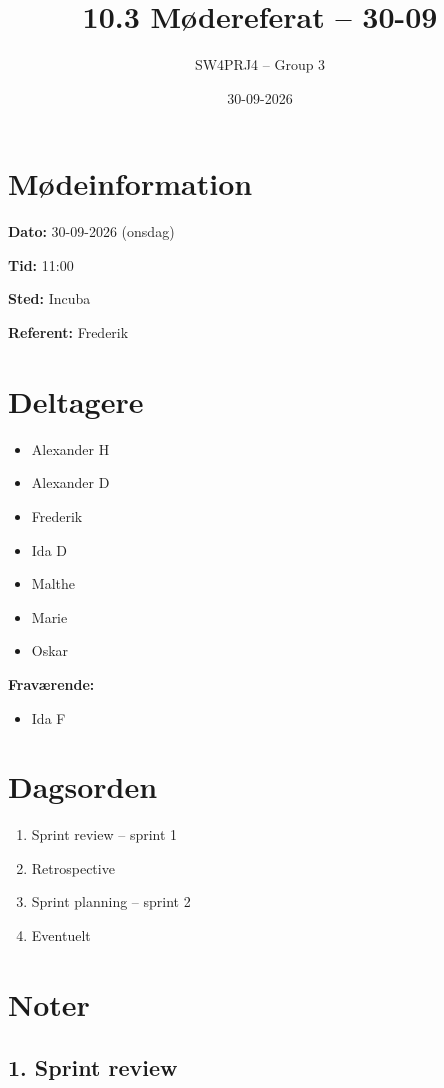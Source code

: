 \documentclass[a4paper,11pt]{article}
\title{10.3 Mødereferat -- 30-09}
\author{SW4PRJ4 -- Group 3}
\date{30-09-2026}
\begin{document}
\maketitle

\section*{Mødeinformation}

\textbf{Dato:} 30-09-2026 (onsdag)

\textbf{Tid:} 11:00

\textbf{Sted:} Incuba

\textbf{Referent:} Frederik

\section*{Deltagere}

\begin{itemize}
    \item Alexander H
    \item Alexander D
    \item Frederik
    \item Ida D
    \item Malthe
    \item Marie
    \item Oskar
\end{itemize}

\textbf{Fraværende:}

\begin{itemize}
    \item Ida F
\end{itemize}

\section*{Dagsorden}

\begin{enumerate}
    \item Sprint review -- sprint 1
    \item Retrospective
    \item Sprint planning -- sprint 2
    \item Eventuelt
\end{enumerate}

\section*{Noter}
\subsection*{1. Sprint review}
\end{document}
